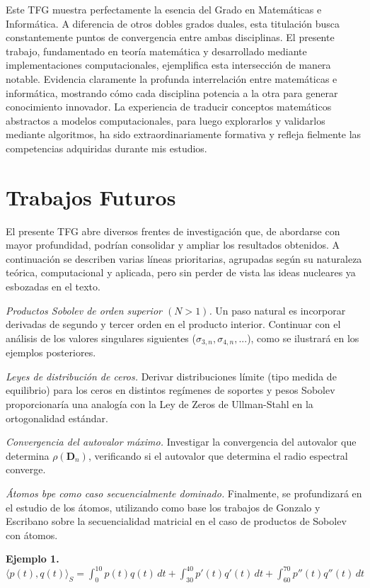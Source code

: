 Este TFG muestra perfectamente la esencia del Grado en Matemáticas e Informática. A diferencia de otros dobles grados duales, esta titulación busca constantemente puntos de convergencia entre ambas disciplinas. El presente trabajo, fundamentado en teoría matemática y desarrollado mediante implementaciones computacionales, ejemplifica esta intersección de manera notable. Evidencia claramente la profunda interrelación entre matemáticas e informática, mostrando cómo cada disciplina potencia a la otra para generar conocimiento innovador. La experiencia de traducir conceptos matemáticos abstractos a modelos computacionales, para luego explorarlos y validarlos mediante algoritmos, ha sido extraordinariamente formativa y refleja fielmente las competencias adquiridas durante mis estudios.

\section{Trabajos Futuros}

El presente TFG abre diversos frentes de investigación que, de abordarse con mayor profundidad, podrían consolidar y ampliar los resultados obtenidos. A continuación se describen varias líneas prioritarias, agrupadas según su naturaleza teórica, computacional y aplicada, pero sin perder de vista las ideas nucleares ya esbozadas en el texto.

\emph{Productos Sobolev de orden superior \((N>1)\).}
Un paso natural es incorporar derivadas de segundo y tercer orden en el producto interior. Continuar con el análisis de los valores singulares siguientes ($\sigma_{3,n}, \sigma_{4,n},...$), como se ilustrará en los ejemplos posteriores.

\emph{Leyes de distribución de ceros.}
Derivar distribuciones límite (tipo medida de equilibrio) para los ceros en distintos regímenes de soportes y pesos Sobolev proporcionaría una analogía con la Ley de Zeros de Ullman-Stahl en la ortogonalidad estándar.

\emph{Convergencia del autovalor máximo.}
Investigar la convergencia del autovalor que determina $\rho(\mathbf{D}_n)$, verificando si el autovalor que determina el radio espectral converge.

\emph{Átomos bpe como caso secuencialmente dominado.}
Finalmente, se profundizará en el estudio de los átomos, utilizando como base los trabajos de Gonzalo y Escribano sobre la secuencialidad matricial en el caso de productos de Sobolev con átomos.

\textbf{Ejemplo 1.}
$\langle p(t),q(t) \rangle_{S}=\int_{0}^{10} p(t)q(t)\, dt + \int_{30}^{40} p'(t)q'(t) \, dt + \int_{60}^{70} p''(t)q''(t) \, dt$

